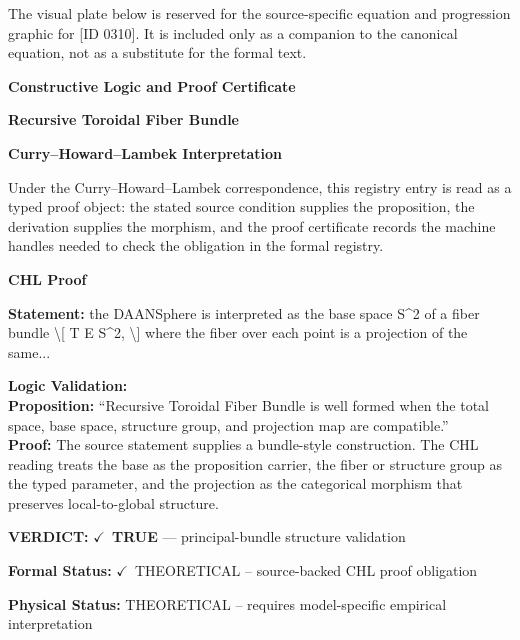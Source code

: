 \begingroup\footnotesize\sloppy
The visual plate below is reserved for the source-specific equation and progression graphic for [ID 0310]. It is included only as a companion to the canonical equation, not as a substitute for the formal text.
\par\endgroup
\ifTZPDarkEdition
{}
\fi

\clearpage
\begingroup\tzpsupportsetup
\noindent\textbf{\fontsize{10.8pt}{12.8pt}\selectfont [ID 0310] Constructive Logic and Proof Certificate}\par
\noindent\textbf{\fontsize{10pt}{12pt}\selectfont Recursive Toroidal Fiber Bundle}\par
\vspace{0.45em}
\begingroup
\footnotesize
\setlength{\parskip}{0.22em}
\setlength{\parindent}{0pt}
\noindent\textbf{Curry--Howard--Lambek Interpretation}\par
Under the Curry--Howard--Lambek correspondence, this registry entry is read as a typed proof
object: the stated source condition supplies the proposition, the derivation supplies the
morphism, and the proof certificate records the machine handles needed to check the obligation
in the formal registry.

\vspace{0.45em}
\noindent\textbf{CHL Proof}\par
\textbf{Statement:} the DAANSphere is interpreted as the base space S\textasciicircum{}2 of a fiber bundle \textbackslash{}[ T E S\textasciicircum{}2, \textbackslash{}]
where the fiber over each point is a projection of the same...

\textbf{Logic Validation:}\\
\textbf{Proposition:} ``Recursive Toroidal Fiber Bundle is well formed when the total space, base space,
structure group, and projection map are compatible.''\\
\textbf{Proof:} The source statement supplies a bundle-style construction. The CHL reading treats the
base as the proposition carrier, the fiber or structure group as the typed parameter,
and the projection as the categorical morphism that preserves local-to-global structure.

\textbf{VERDICT:} \ensuremath{\checkmark}\ \textbf{TRUE} --- principal-bundle structure validation

\textbf{Formal Status:} \ensuremath{\checkmark}\ THEORETICAL -- source-backed CHL proof obligation

\textbf{Physical Status:} THEORETICAL -- requires model-specific empirical interpretation
\par\vspace{0.45em}
\par
\ifTZPDarkEdition
{}
\fi
\endgroup
\endgroup
